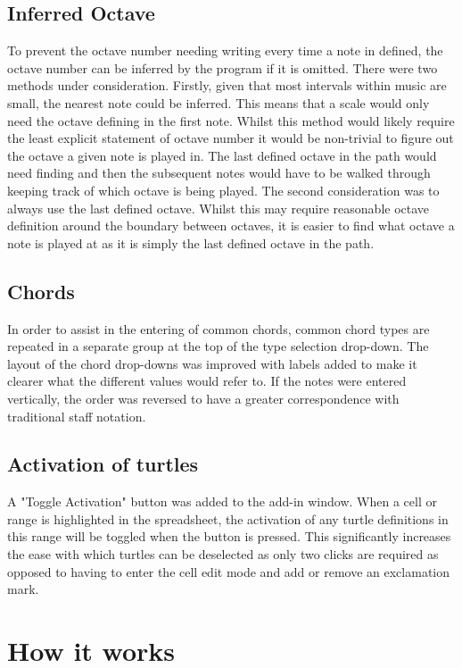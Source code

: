 \subsection{Inferred Octave}

To prevent the octave number needing writing every time a note in defined, the octave number can be inferred by the program if it is omitted. There were two methods under consideration. Firstly, given that most intervals within music are small, the nearest note could be inferred. This means that a scale would only need the octave defining in the first note. Whilst this method would likely require the least explicit statement of octave number it would be non-trivial to figure out the octave a given note is played in. The last defined octave in the path would need finding and then the subsequent notes would have to be walked through keeping track of which octave is being played. The second consideration was to always use the last defined octave. Whilst this may require reasonable octave definition around the boundary between octaves, it is easier to find what octave a note is played at as it is simply the last defined octave in the path.

\subsection{Chords}

In order to assist in the entering of common chords, common chord types are repeated in a separate group  at the top of the type selection drop-down. The layout of the chord drop-downs was improved with labels added to make it clearer what the different values would refer to. If the notes were entered vertically, the order was reversed to have a greater correspondence with traditional staff notation.

\subsection{Activation of turtles}

A "Toggle Activation" button was added to the add-in window. When a cell or range is highlighted in the spreadsheet, the activation of any turtle definitions in this range will be toggled when the button is pressed.  This significantly increases the ease with which turtles can be deselected as only two clicks are required as opposed to having to enter the cell edit mode and add or remove an exclamation mark.

\section{How it works}

